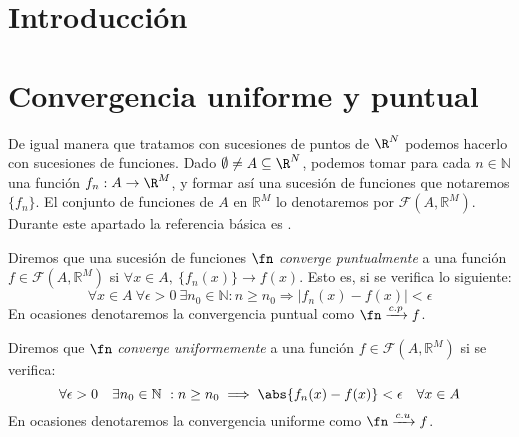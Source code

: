
\section*{Introducción}


\newpage


\section{Convergencia uniforme y puntual}
De igual manera que tratamos con sucesiones de puntos de $\R^N$ podemos hacerlo con sucesiones de funciones. Dado $\emptyset \ne A \subseteq \R^N$, podemos tomar para cada $n \in \mathbb{N}$ una función $f_n : A \to \R^M$, y formar así una sucesión de funciones que notaremos $\{f_n\}$. El conjunto de funciones de $A$ en $\mathbb{R}^M$ lo denotaremos por $\mathcal{F}(A,\mathbb{R}^M)$. Durante este apartado la referencia básica es \cite[Capítulo 5]{marsden}.

\begin{ndef} Diremos que una sucesión de funciones $\fn$ \textit{converge puntualmente} a una función $f\in \mathcal{F}(A,\mathbb{R}^M)$ si $\forall x \in A, \ \{f_n(x)\} \rightarrow f(x)$. Esto es, si se verifica lo siguiente:
  \[
    \forall x\in A\ \forall \epsilon > 0\ \exists n_0 \in \mathbb{N}: n \ge n_0 \Rightarrow |f_n(x)-f(x)| < \epsilon
  \]
  En ocasiones denotaremos la convergencia puntual como $\fn \xrightarrow {c.p} f$.
\end{ndef}


\begin{ndef} Diremos que $\fn$ \textit{converge uniformemente} a una función $f \in \mathcal{F}(A,\mathbb{R}^M)$ si se verifica:
  \[
    \forall \epsilon>0 \quad \exists n_0 \in \mathbb{N}\ : n\ge n_0\implies \abs{f_n(x)-f(x)} < \epsilon \quad \forall x \in A
  \]
  En ocasiones denotaremos la convergencia uniforme como $\fn \xrightarrow {c.u} f$.
\end{ndef}


